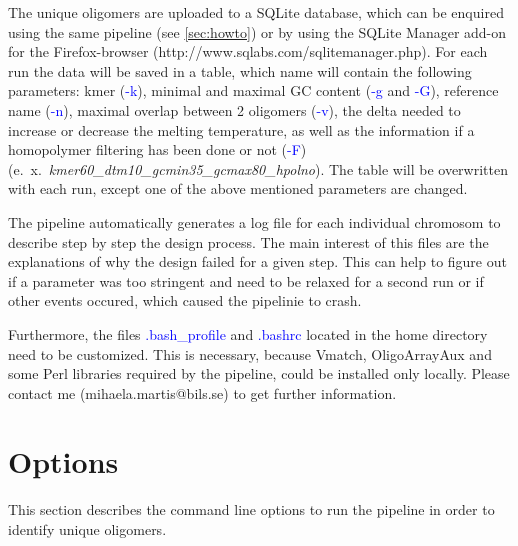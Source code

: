 \documentclass[a4paper,10pt]{report}
\begin{document}
The unique oligomers are uploaded to a SQLite database, which can be enquired using the same pipeline (see \ref{sec:howto}) or by using the SQLite Manager add-on for
the Firefox-browser (http://www.sqlabs.com/sqlitemanager.php). For each run the data will be saved in a table, which name will contain the following parameters: kmer
(\textcolor{blue}{-k}), minimal and maximal GC content (\textcolor{blue}{-g} and \textcolor{blue}{-G}), reference name (\textcolor{blue}{-n}), maximal overlap between
2 oligomers (\textcolor{blue}{-v}), the delta needed to increase or decrease the melting temperature, as well as the information if a homopolymer filtering has been 
done or not (\textcolor{blue}{-F}) (e.~x.~\textit{kmer60\_dtm10\_gcmin35\_gcmax80\_hpolno}). The table will be overwritten with each run, except one of the above mentioned
parameters are changed.

The pipeline automatically generates a log file for each individual chromosom to describe step by step the design process. The main interest of this files are the
explanations of why the design failed for a given step. This can help to figure out if a parameter was too stringent and need to be relaxed for a second run or if
other events occured, which caused the pipelinie to crash.

Furthermore, the files \textcolor{blue}{.bash\_profile} and \textcolor{blue}{.bashrc} located in the home directory need to be customized. This is necessary, because
Vmatch, OligoArrayAux and some Perl libraries required by the pipeline, could be installed only locally. Please contact me (mihaela.martis@bils.se) to get further
information.

\section{Options}
\label{sec:param}
This section describes the command line options to run the pipeline in order to identify unique oligomers.\\
\end{document}
